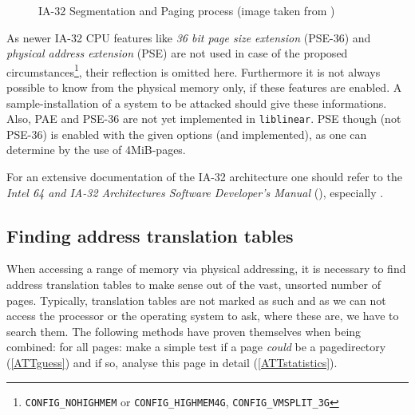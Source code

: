 \begin{figure}[ht] \begin{center}



	\caption{IA-32 Segmentation and Paging process (image taken from
	\cite{IA32_SDM_3a:2006})}

	\label{fig:ia32_segmentation_paging}

\end{center}\end{figure}

As newer IA-32 CPU features like \emph{36 bit page size extension} (PSE-36) and
\emph{physical address extension} (PSE) are not used in case of the proposed
circumstances\footnote{\texttt{CONFIG\_NOHIGHMEM} or \texttt{CONFIG\_HIGHMEM4G},
\texttt{CONFIG\_VMSPLIT\_3G}}, their reflection is omitted here.  Furthermore it
is not always possible to know from the physical memory only, if these features
are enabled.  A sample-installation of a system to be attacked should give these
informations.  Also, PAE and PSE-36 are not yet implemented in
\texttt{liblinear}. PSE though (not PSE-36) is enabled with the given options
(and implemented), as one can determine by the use of 4MiB-pages.

For an extensive documentation of the IA-32 architecture one should refer to the
\emph{Intel 64 and IA-32 Architectures Software Developer's Manual}
(\cite{IA32_SDM_1:2006,IA32_SDM_2a:2006,IA32_SDM_2b:2006,IA32_SDM_3a:2006,IA32_SDM_3b:2006}),
especially \cite{IA32_SDM_3a:2006}.



\subsection{Finding address translation tables}
\label{findingATT}

When accessing a range of memory via physical addressing, it is necessary to
find address translation tables to make sense out of the vast, unsorted number
of pages. Typically, translation tables are not marked as such and as we can not
access the processor or the operating system to ask, where these are, we have to
search them. The following methods have proven themselves when being combined:
for all pages: make a simple test if a page \emph{could} be a pagedirectory
(\ref{ATTguess}) and if so, analyse this page in detail (\ref{ATTstatistics}).



